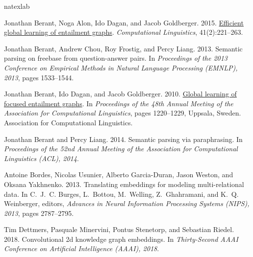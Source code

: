 \documentclass[11pt,a4paper]{article}
\begin{document}
\begin{thebibliography}{29}
\expandafter\ifx\csname natexlab\endcsname\relax\def\natexlab#1{#1}\fi

Jonathan Berant, Noga Alon, Ido Dagan, and Jacob Goldberger. 2015.
\newblock \href {https://doi.org/10.1162/COLI_a_00220} {Efficient global
  learning of entailment graphs}.
\newblock \emph{Computational Linguistics}, 41(2):221--263.

Jonathan Berant, Andrew Chou, Roy Frostig, and Percy Liang. 2013.
\newblock Semantic parsing on freebase from question-answer pairs.
\newblock In \emph{Proceedings of the 2013 Conference on Empirical Methods in
  Natural Language Processing (EMNLP), 2013}, pages 1533--1544.

Jonathan Berant, Ido Dagan, and Jacob Goldberger. 2010.
\newblock \href {https://www.aclweb.org/anthology/P10-1124} {Global learning of
  focused entailment graphs}.
\newblock In \emph{Proceedings of the 48th Annual Meeting of the Association
  for Computational Linguistics}, pages 1220--1229, Uppsala, Sweden.
  Association for Computational Linguistics.

Jonathan Berant and Percy Liang. 2014.
\newblock Semantic parsing via paraphrasing.
\newblock In \emph{Proceedings of the 52nd Annual Meeting of the Association
  for Computational Linguistics (ACL), 2014}.

Antoine Bordes, Nicolas Usunier, Alberto Garcia-Duran, Jason Weston, and Oksana
  Yakhnenko. 2013.
\newblock Translating embeddings for modeling multi-relational data.
\newblock In C.~J.~C. Burges, L.~Bottou, M.~Welling, Z.~Ghahramani, and K.~Q.
  Weinberger, editors, \emph{Advances in Neural Information Processing Systems
  (NIPS), 2013}, pages 2787--2795.

Tim Dettmers, Pasquale Minervini, Pontus Stenetorp, and Sebastian Riedel. 2018.
\newblock Convolutional 2d knowledge graph embeddings.
\newblock In \emph{Thirty-Second AAAI Conference on Artificial Intelligence
  (AAAI), 2018}.


\end{thebibliography}
\end{document}
